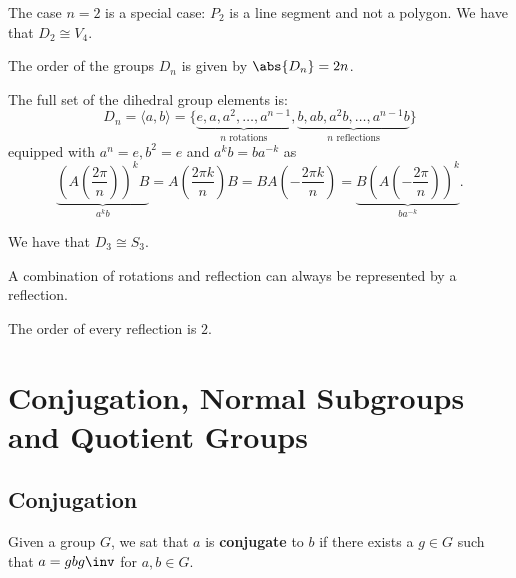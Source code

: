 \documentclass[12pt, a4paper]{article}
\begin{document}
\begin{mdremark}
    The case \(n=2\) is a special case: \(P_2\) is a line segment and not a polygon. We have that \(D_2 \cong V_4\).
\end{mdremark}

\begin{proposition}
    The order of the groups \(D_n\) is given by \(\abs{D_n}=2n\).
\end{proposition}

\begin{mdthm}
    The full set of the dihedral group elements is:
    \[D_n =\langle a,b \rangle = \{\underbrace{e,a,a^2,\ldots, a^{n-1}}_{n \text{ rotations}}, \underbrace{b,ab,a^2b,\ldots, a^{n-1}b}_{n \text{ reflections}}\}\]
    equipped with \(a^n =e, b^2=e\) and \(a^kb =ba^{-k}\) as 
    \[
    \underbrace{\left( A\left( \frac{2\pi}{n} \right) \right)^k B}_{a^k b} = A\left( \frac{2\pi k}{n} \right)B = B A\left(  - \frac{2\pi k}{n} \right) = \underbrace{B \left( A\left( -\frac{2\pi}{n} \right) \right)^k}_{ba^{-k}}.
    \]
\end{mdthm}

\begin{mdremark}
    We have that \(D_3 \cong S_3\).
\end{mdremark}

\begin{corollary}
    A combination of rotations and reflection can always be represented by a reflection.
\end{corollary}

\begin{mdcor}
    The order of every reflection is \(2\).
\end{mdcor}

\pagebreak

\section{Conjugation, Normal Subgroups and Quotient Groups}

\subsection{Conjugation}

\begin{definition}
    Given a group \(G\), we sat that \(a\) is \textbf{conjugate} to \(b\) if there exists a \(g \in G\) such that \(a=gbg\inv\) for \(a,b\in G\).
\end{definition}
\end{document}
